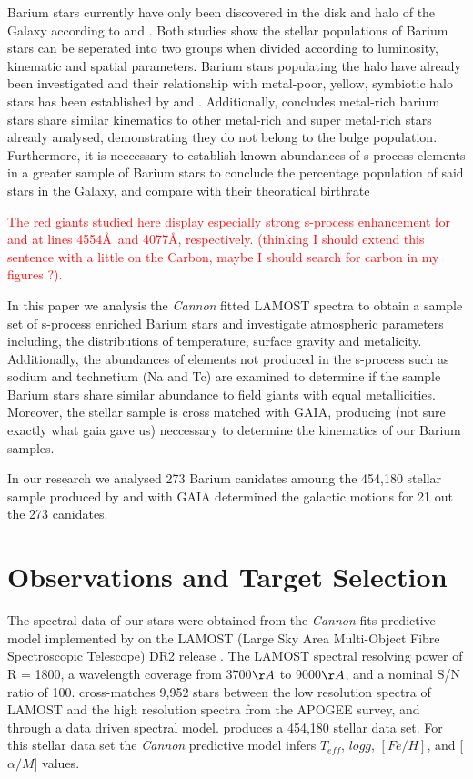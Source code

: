 \documentclass[a4paper,fleqn,usenatbib]{mnras}
\newcommand{\todo}[1]{\textcolor{red}{#1}}
\begin{document}
Barium stars currently have only been discovered in the disk and halo of the Galaxy according to \citet{gomez1997} and \citet{mennessier1997}. Both studies show the stellar populations of Barium stars can be seperated into two groups when divided according to luminosity, kinematic and spatial parameters. Barium stars populating the halo have already been investigated \citep[e.g.][]{junqueira2001,drake2008,pereira2009,allen2006} and their relationship with metal-poor, yellow, symbiotic halo stars has been established by \citet{jorissen2005} and \citet{pereira2009}. Additionally, \citet{pereira2011} concludes metal-rich barium stars share similar kinematics to other metal-rich and super metal-rich stars already analysed, demonstrating they do not belong to the bulge population. Furthermore, it is neccessary to establish known abundances of s-process elements in a greater sample of Barium stars to conclude the percentage population of said stars in the Galaxy, and compare with their theoratical birthrate \citep{han1995}



\todo{The red giants studied here display especially strong s-process enhancement for \ion{Ba}{II} and \ion{Sr}{II} at lines 4554\AA\ and 4077\AA, respectively. (thinking I should extend this sentence with a little on the Carbon, maybe I should search for carbon in my figures ?). }

In this paper we analysis the \textit{Cannon} fitted LAMOST spectra \citep{ho2017} to obtain a sample set of s-process enriched Barium stars and investigate atmospheric parameters including, the distributions of temperature, surface gravity and metalicity. Additionally, the abundances of elements not produced in the s-process such as sodium and technetium (Na and Tc) are examined to determine  if the sample Barium stars share similar abundance to field giants with equal metallicities. Moreover, the stellar sample is cross matched with GAIA, producing (not sure exactly what gaia gave us) neccessary to determine the kinematics of our Barium samples. 

In our research we analysed 273 Barium canidates amoung the 454,180 stellar sample produced by \citet{ho2017} and with GAIA determined the galactic motions for 21 out the 273 canidates.

\section{Observations and Target Selection}
The spectral data of our stars were obtained from the \textit{Cannon} fits predictive model implemented by \citet{ho2017} on the LAMOST (Large Sky Area Multi-Object Fibre Spectroscopic Telescope) DR2 release \citep{luo2015}. The LAMOST spectral resolving power of R = 1800, a wavelength coverage from 3700$\AA$ to 9000$\AA$, and a nominal S/N ratio of 100. \citet{ho2017} cross-matches 9,952 stars between the low resolution spectra of LAMOST and the high resolution spectra from the APOGEE survey, and through a data driven spectral model. produces a 454,180 stellar data set. For this stellar data set the \textit{Cannon} predictive model infers $T_{eff}$, $log g$, $[Fe/H]$, and [$\alpha/M$] values.
\end{document}
